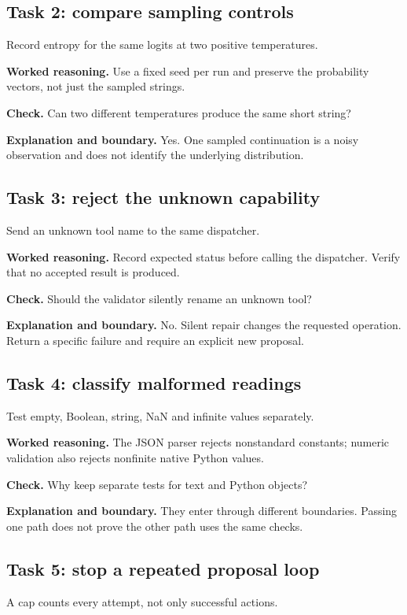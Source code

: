 \subsection{Task 2: compare sampling controls}
Record entropy for the same logits at two positive temperatures.

\textbf{Worked reasoning.} Use a fixed seed per run and preserve the probability vectors, not just the sampled strings.

\textbf{Check.} Can two different temperatures produce the same short string?

\textbf{Explanation and boundary.} Yes. One sampled continuation is a noisy observation and does not identify the underlying distribution.

\subsection{Task 3: reject the unknown capability}
Send an unknown tool name to the same dispatcher.

\textbf{Worked reasoning.} Record expected status before calling the dispatcher. Verify that no accepted result is produced.

\textbf{Check.} Should the validator silently rename an unknown tool?

\textbf{Explanation and boundary.} No. Silent repair changes the requested operation. Return a specific failure and require an explicit new proposal.

\subsection{Task 4: classify malformed readings}
Test empty, Boolean, string, NaN and infinite values separately.

\textbf{Worked reasoning.} The JSON parser rejects nonstandard constants; numeric validation also rejects nonfinite native Python values.

\textbf{Check.} Why keep separate tests for text and Python objects?

\textbf{Explanation and boundary.} They enter through different boundaries. Passing one path does not prove the other path uses the same checks.

\subsection{Task 5: stop a repeated proposal loop}
A cap counts every attempt, not only successful actions.

